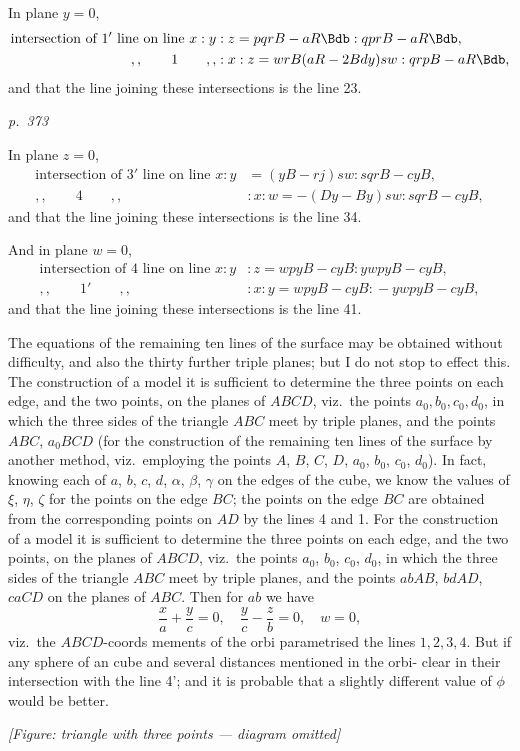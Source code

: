 \documentclass[11pt,a4paper]{article}
\theoremstyle{plain}
\theoremstyle{definition}
\begin{document}
In plane $y = 0$,
\begin{align*}
\text{intersection of } 1' \text{ line on line } x : y &: z = pqr B - aR\Bdb : qprB - aR\Bdb, \\
,, \qquad 1 \qquad ,, &: x : z = wrB(aR - 2Bdy) sw : qrpB - aR\Bdb,
\end{align*}
and that the line joining these intersections is the line 23.

\clearpage

\bigskip
\textit{p.~373}
\smallskip

\noindent
In plane $z = 0$,
\begin{align*}
\text{intersection of } 3' \text{ line on line } x : y &= (yB - rj) sw : sqrB - cyB\dot, \\
,, \qquad 4 \qquad ,, &: x : w = -(D y - B y) sw : sqrB - cyB\dot,
\end{align*}
and that the line joining these intersections is the line 34.

And in plane $w = 0$,
\begin{align*}
\text{intersection of } 4 \text{ line on line } x : y &: z = wp y B - cyB\dot : ywp y B - cyB\dot, \\
,, \qquad 1' \qquad ,, &: x : y = wp y B - cyB\dot : -ywp y B - cyB\dot,
\end{align*}
and that the line joining these intersections is the line 41.

The equations of the remaining ten lines of the surface may be obtained without
difficulty, and also the thirty further triple planes; but I do not stop to effect this.
The construction of a model it is sufficient to determine the three points on each edge,
and the two points, on the planes of $ABCD$, viz.\ the points $a_0, b_0, c_0, d_0$, in which the
three sides of the triangle $ABC$ meet by triple planes, and the points $ABC$, $a_0BCD$
(for the construction of the remaining ten lines of the surface by another method,
viz.\ employing the points $A$, $B$, $C$, $D$, $a_0$, $b_0$, $c_0$, $d_0$).  In fact, knowing
each of $a$, $b$, $c$, $d$, $\alpha$, $\beta$, $\gamma$ on the edges of the cube, we know
the values of $\xi$, $\eta$, $\zeta$ for the points on the edge $BC$; the points on the edge $BC$
are obtained from the corresponding points on $AD$ by the lines 4 and 1.  For
the construction of a model it is sufficient to determine the three points on each
edge, and the two points, on the planes of $ABCD$, viz.\ the points $a_0$, $b_0$, $c_0$, $d_0$, in
which the three sides of the triangle $ABC$ meet by triple planes, and the points
$abAB$, $bdAD$, $caCD$ on the planes of $ABC$.  Then for $ab$ we have
\[
\frac{x}{a} + \frac{y}{c} = 0, \quad \frac{y}{c} - \frac{z}{b} = 0, \quad w = 0,
\]
viz.\ the $ABCD$-coords mements of the orbi parametrised the lines $1, 2, 3, 4$.
But if any sphere of an cube and several distances mentioned in the orbi-
clear in their intersection with the line 4'; and it is probable that a slightly
different value of $\phi$ would be better.
\begin{center}
\textit{[Figure: triangle with three points --- diagram omitted]}
\end{center}
\end{document}
